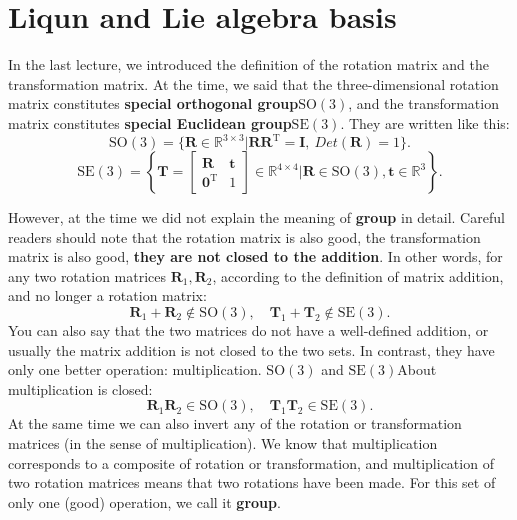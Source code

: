 \section{Liqun and Lie algebra basis}

In the last lecture, we introduced the definition of the rotation matrix and the transformation matrix. At the time, we said that the three-dimensional rotation matrix constitutes \textbf{special orthogonal group}$\mathrm{SO}(3)$, and the transformation matrix constitutes \textbf{special Euclidean group}$\mathrm{SE}(3) $. They are written like this:
\begin{equation}
\mathrm{SO}(3) = \{ \bm{R} \in \mathbb{R}^{3 \times 3} | \bm{RR}^\mathrm{T} = \bm{I}, \ Det(\bm{R})=1 \}.
\end{equation}
\begin{equation}
\mathrm{SE}(3) = \left\{ \bm{T} = \left[ {\begin{array}{*{20}{c}}
  \bm{R} & \bm{t} \\
  {{\bm{0}^\mathrm{T}}} & 1
  \end{array}} \right]
  \in \mathbb{R}^{4 \times 4} | \bm{R} \in \mathrm{SO}(3), \bm{t} \in \mathbb{R}^3\right\}.
  \end{equation}

  However, at the time we did not explain the meaning of \textbf{group} in detail. Careful readers should note that the rotation matrix is ​​also good, the transformation matrix is ​​also good, \textbf{they are not closed to the addition}. In other words, for any two rotation matrices $\bm{R}_1, \bm{R}_2$, according to the definition of matrix addition, and no longer a rotation matrix:
  \begin{equation}
  \bm{R}_1 + \bm{R}_2 \notin \mathrm{SO}(3), \quad \bm{T}_1 + \bm{T}_2 \notin \mathrm{SE}(3).
  \end{equation}
  You can also say that the two matrices do not have a well-defined addition, or usually the matrix addition is not closed to the two sets. In contrast, they have only one better operation: multiplication. $\mathrm{SO}(3)$ and $\mathrm{SE}(3)$About multiplication is closed:
  \begin{equation}
  \bm{R}_1 \bm{R}_2 \in \mathrm{SO}(3), \quad \bm{T}_1 \bm{T}_2 \in \mathrm{SE}(3).
  \end{equation}
  At the same time we can also invert any of the rotation or transformation matrices (in the sense of multiplication). We know that multiplication corresponds to a composite of rotation or transformation, and multiplication of two rotation matrices means that two rotations have been made. For this set of only one (good) operation, we call it \textbf{group}.

